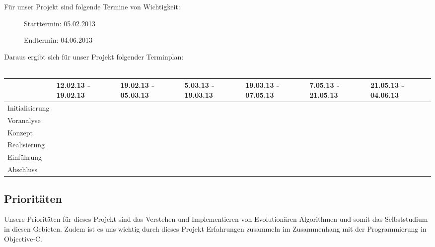 \documentclass{scrartcl}
\begin{document}
	Für unser Projekt sind folgende Termine von Wichtigkeit:
	\begin{description}
		\item[] Starttermin: 05.02.2013
		\item[] Endtermin: 04.06.2013
	\end{description}
	Daraus ergibt sich für unser Projekt folgender Terminplan:
	\\ \\
	\tiny{
	\begin{tabular}{| p{2cm} | p{1cm} | p{1cm} | p{1cm} | p{1cm} | p{1cm} | p{1cm} |}
	\hline
	\rowcolor[gray]{0.9}  & 12.02.13 - 19.02.13 & 19.02.13 - 05.03.13 & 5.03.13 - 19.03.13 & 19.03.13 - 07.05.13 & 7.05.13 - 21.05.13 & 21.05.13 - 04.06.13 \\
	\hline
	Initialisierung & \cellcolor{yellow} & & & & & \\
	\hline
	Voranalyse & &  \cellcolor{yellow}& & & & \\
	\hline
	Konzept & & &  \cellcolor{yellow}& & & \\
	\hline
	Realisierung & & & &  \cellcolor{yellow}& & \\
	\hline
	Einführung & & & & & \cellcolor{yellow}& \\
	\hline
	Abschluss & & & & &  &\cellcolor{yellow} \\
	\hline
	\end{tabular}	
	}
	\small{
	\subsection{Prioritäten}
	Unsere Prioritäten für dieses Projekt sind das Verstehen und Implementieren von Evolutionären Algorithmen und somit das Selbststudium in diesen Gebieten. Zudem ist es uns wichtig durch dieses Projekt Erfahrungen zusammeln im Zusammenhang mit der Programmierung in Objective-C. 
}
\end{document}

